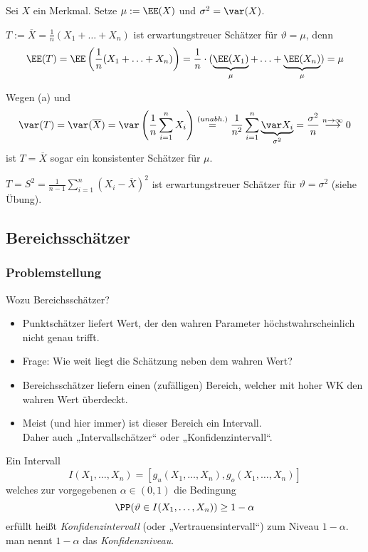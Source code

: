  Sei $X$ ein Merkmal. Setze $\mu := \EE(X)$ und $\sigma ^2 = \var (X)$.
\begin{anumerate}
\item $T:= \overline{X} = \frac{1}{n} (X_1+\ldots + X_n)$ ist erwartungstreuer Schätzer für $\vartheta = \mu$, denn
$$\EE(T)=\EE \left( \frac{1}{n} (X_1+\ldots + X_n) \right)=\frac{1}{n}\cdot (\underbrace{\EE(X_1)}_{\mu}+\ldots + \underbrace{\EE(X_n)}_{\mu})=\mu $$
\item Wegen (a) und 
$$\var (T)=\var (\overline{X}) = \var \left( \frac{1}{n} \sum_{i=1}^n X_i\right) \overset{(unabh.)}{=}\frac{1}{n^2}\sum_{i=1}^n \underbrace{\var X_i}_{\sigma^2} = \frac{\sigma^2}{n} \overset{n\to \infty}{\longrightarrow} 0$$
ist $T=\overline{X}$ sogar ein konsistenter Schätzer für $\mu$.
\item $T=S^2 = \frac{1}{n-1}\sum_{i=1}^n (X_i-\overline{X})^2$ ist erwartungstreuer Schätzer für $\vartheta = \sigma^2$ (siehe Übung).
\end{anumerate}

\subsection{Bereichsschätzer}

\subsubsection{Problemstellung}

Wozu Bereichsschätzer?
\begin{itemize}
\item Punktschätzer liefert Wert, der den wahren Parameter höchstwahrscheinlich nicht genau trifft.
\item Frage: Wie weit liegt die Schätzung neben dem wahren Wert?
\item Bereichsschätzer liefern einen (zufälligen) Bereich, welcher mit hoher WK den wahren Wert überdeckt.
\item Meist (und hier immer) ist dieser Bereich ein Intervall.\\
Daher auch „Intervallschätzer“ oder „Konfidenzintervall“.
\end{itemize}

 Ein Intervall
$$I(X_1, \ldots, X_n) =[g_u (X_1, \ldots, X_n), g_o(X_1, \ldots, X_n)]$$
welches zur vorgegebenen $\alpha \in (0,1)$ die Bedingung
$$\PP(\vartheta \in I(X_1, \ldots, X_n)) \geq 1-\alpha$$
erfüllt heißt \emph{Konfidenzintervall} (oder „Vertrauensintervall“) zum Niveau $1-\alpha$. man nennt $1-\alpha$ das \emph{Konfidenzniveau}.


